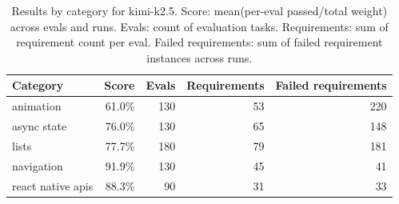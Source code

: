 \begin{table}[htbp]
\centering
\begin{tabular}{lrrrr}
\toprule
Category & Score & Evals & Requirements & Failed requirements \\
\midrule
animation & 61.0\% & 130 & 53 & 220 \\
async state & 76.0\% & 130 & 65 & 148 \\
lists & 77.7\% & 180 & 79 & 181 \\
navigation & 91.9\% & 130 & 45 & 41 \\
react native apis & 88.3\% & 90 & 31 & 33 \\
\bottomrule
\end{tabular}
\caption{Results by category for kimi-k2.5. Score: mean(per-eval passed/total weight) across evals and runs. Evals: count of evaluation tasks. Requirements: sum of requirement count per eval. Failed requirements: sum of failed requirement instances across runs.}
\end{table}
